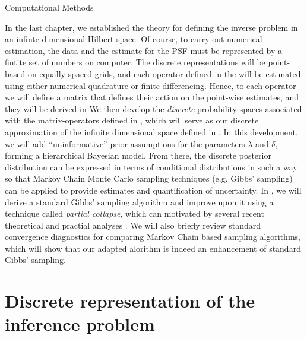 \setlength{\parindent}{2ex}
\newcommand{\Ab}{{\bf A}}
\newcommand{\N}{\mathcal{N}}
\begin{chapter}{Computational Methods}\label{chapter:computational}

In the last chapter, we established the theory for defining the inverse problem in an infinte dimensional Hilbert space.
Of course, to carry out numerical estimation, the data and the estimate for the PSF must be represented by a fintite set of numbers on computer.
The discrete representations will be point-based on equally spaced grids, and each operator defined in the  will be estimated using either numerical quadrature or finite differencing.
Hence, to each operator we will define a matrix that defines their action on the point-wise estimates, and they will be derived in 
We then develop the \emph{discrete} probability spaces associated with the matrix-operators defined in , which will serve as our discrete approximation of the infinite dimensional space defined in .
In this development, we will add ``uninformative'' prior assumptions for the parameters $\lambda$ and $\delta$, forming a hierarchical Bayesian model.
From there, the discrete posterior distribution can be expressed in terms of conditional distributions in such a way so that Markov Chain Monte Carlo sampling techniques (e.g. Gibbs' sampling) can be applied to provide estimates and quantification of uncertainty.
In , we will derive a standard Gibbs' sampling algorithm \cite{geman1984stochastic} and improve upon it using a technique called \emph{partial collapse}, which can motivated by several recent theoretical and practial analyses \citep{van2008partially,agapiou2014analysis,fox2015fast}.
We will also briefly review standard convergence diagnostics for comparing Markov Chain based sampling algorithms, which will show that our adapted alorithm is indeed an enhancement of standard Gibbs' sampling.

\section{Discrete representation of the inference problem} \label{sec:discretization}


\end{chapter}
